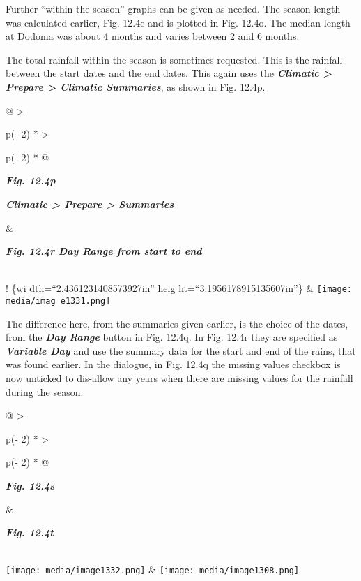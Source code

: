 \documentclass[
  letterpaper,
  DIV=11,
  numbers=noendperiod]{scrreprt}
\begin{document}
Further ``within the season'' graphs can be given as needed. The season
length was calculated earlier, Fig. 12.4e and is plotted in Fig. 12.4o.
The median length at Dodoma was about 4 months and varies between 2 and
6 months.

The total rainfall within the season is sometimes requested. This is the
rainfall between the start dates and the end dates. This again uses the
\textbf{\emph{Climatic \textgreater{} Prepare \textgreater{} Climatic
Summaries}}, as shown in Fig. 12.4p.

\begin{longtable}[]{@{}
  >{\raggedright\arraybackslash}p{(\columnwidth - 2\tabcolsep) * }
  >{\raggedright\arraybackslash}p{(\columnwidth - 2\tabcolsep) * }@{}}
\toprule\noalign{}
\begin{minipage}[b]{\linewidth}\raggedright
\textbf{\emph{Fig. 12.4p}}

\textbf{\emph{Climatic \textgreater{} Prepare \textgreater{} Summaries}}
\end{minipage} & \begin{minipage}[b]{\linewidth}\raggedright
\textbf{\emph{Fig. 12.4r Day Range from start to end}}
\end{minipage} \\
\midrule\noalign{}
\endhead
\bottomrule\noalign{}
\endlastfoot
! \href{media/image1329.png}{}\{wi dth=``2.4361231408573927in'' heig
ht=``3.1956178915135607in''\} &
\texttt{[image: media/imag e1331.png]} \\
\end{longtable}

The difference here, from the summaries given earlier, is the choice of
the dates, from the \textbf{\emph{Day Range}} button in Fig. 12.4q. In
Fig. 12.4r they are specified as \textbf{\emph{Variable Day}} and use
the summary data for the start and end of the rains, that was found
earlier. In the dialogue, in Fig. 12.4q the missing values checkbox is
now unticked to dis-allow any years when there are missing values for
the rainfall during the season.

\begin{longtable}[]{@{}
  >{\raggedright\arraybackslash}p{(\columnwidth - 2\tabcolsep) * }
  >{\raggedright\arraybackslash}p{(\columnwidth - 2\tabcolsep) * }@{}}
\toprule\noalign{}
\begin{minipage}[b]{\linewidth}\raggedright
\textbf{\emph{Fig. 12.4s}}
\end{minipage} & \begin{minipage}[b]{\linewidth}\raggedright
\textbf{\emph{Fig. 12.4t}}
\end{minipage} \\
\midrule\noalign{}
\endhead
\bottomrule\noalign{}
\endlastfoot
\texttt{[image: media/image1332.png]}
&
\texttt{[image: media/image1308.png]} \\
\end{longtable}
\end{document}

